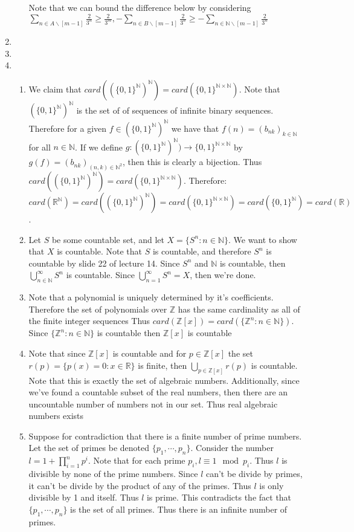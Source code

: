 \documentclass[12pt, letterpaper]{article}
\newcommand{\Z}{\mathbb{Z}}
\newcommand{\N}{\mathbb{N}}
\newcommand{\R}{\mathbb{R}}
\begin{document}
\begin{enumerate}
\begin{itemize}
		Note that we can bound the difference below by considering $\sum_{n \in A \backslash [m-1]} \frac{2}{3^n} \geq \frac{2}{3^m}, -\sum_{n \in B \backslash [m-1]}\frac{2}{3^n}\geq -\sum_{n \in \N \backslash [m-1]}\frac{2}{3^n}$
	\end{itemize}
	\item 
	\item 
	\item
	\begin{enumerate}
		\item We claim that $card((\{0,1\}^\N)^\N) = card(\{0,1\}^{\N\times \N})$.
		Note that $(\{0,1\}^\N)^\N$ is the set of of sequences of infinite binary sequences.  Therefore for a given $f \in (\{0,1\}^\N)^\N$ we have that $f(n) = (b_{nk})_{ k\in \N}$ for all $n \in \N$.  If we define $g:(\{0,1\}^\N)^\N) \to \{0,1\}^{\N\times \N}$ by $g(f) = (b_{nk})_{(n,k) \in \N^2}$, then this is clearly a bijection.  Thus $card((\{0,1\}^\N)^\N) = card(\{0,1\}^{\N\times \N})$.
		Therefore: $$card(\R^\N) = card((\{0,1\}^\N)^\N) = card(\{0,1\}^{\N\times \N}) = card(\{0,1\}^{\N}) = card(\R)$$.    
		\item Let $S$ be some countable set, and let $X = \{S^n : n \in \N\}$.  We want to show that $X$ is countable.  
		Note that $S$ is countable, and therefore $S^n$ is countable by slide 22 of lecture 14.  Since $S^n$ and $\N$ is countable, then $\bigcup_{n \in \N}^\infty S^n$ is countable.  Since $\bigcup_{n=1}^\infty S^n = X$, then we're done.  
		\item Note that a polynomial is uniquely determined by it's coefficients.
		Therefore the set of polynomials over $\Z$ has the same cardinality as all of the finite integer sequences  Thus $card(\Z[x]) = card(\{\Z^n: n \in \N\}).$  
		Since $\{\Z^n: n \in \N\}$ is countable then $\Z[x]$ is countable
		\item Note that since $\Z[x]$ is countable and for $p \in \Z[x]$ the set
		$r(p) = \{p(x) = 0 : x \in \R \}$ is finite, then $\bigcup_{p \in \Z[x]} r(p)$ is countable.  Note that this is exactly the set of algebraic numbers.  Additionally, since we've found a countable subset of the real numbers, then 
		there are an uncountable number of numbers not in our set.  Thus real algebraic numbers exists \\ 
		\item Suppose for contradiction that there is a finite number of prime numbers.  Let the set of primes be denoted
		$\{p_1,\cdots,p_n\}$.  Consider the number $l = 1 + \prod_{i=1}^n p^i$.  Note that for each prime $p_i, l \equiv 1 \mod{p_i}$.  Thus $l$ is divisible by none of the prime numbers.  Since $l$ can't be divide by primes, it can't be divide by the product of any of the primes.  Thus $l$ is only divisible by 1 and itself.  Thus $l$ is prime.  This contradicts the fact that  $\{p_1,\cdots,p_n\}$ is the set of all primes.  Thus there is an infinite number of primes.
	\end{enumerate}
\end{enumerate}
\end{document}
